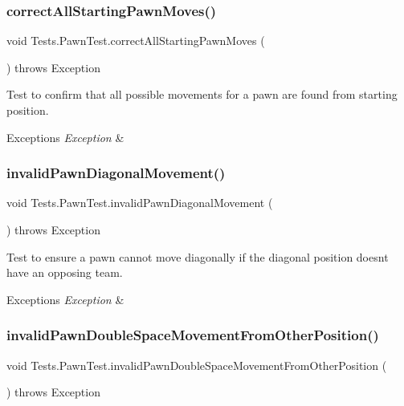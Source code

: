 \subsubsection{\texorpdfstring{correct\+All\+Starting\+Pawn\+Moves()}{correctAllStartingPawnMoves()}}
{\footnotesize\ttfamily void Tests.\+Pawn\+Test.\+correct\+All\+Starting\+Pawn\+Moves (\begin{DoxyParamCaption}{ }\end{DoxyParamCaption}) throws Exception}

Test to confirm that all possible movements for a pawn are found from starting position. 
\begin{DoxyExceptions}{Exceptions}
{\em Exception} & \\
\hline
\end{DoxyExceptions}
\hypertarget{class_tests_1_1_pawn_test_a5de98c4a33ad5690dda92cebdf5612a4}{}\label{class_tests_1_1_pawn_test_a5de98c4a33ad5690dda92cebdf5612a4} 
\subsubsection{\texorpdfstring{invalid\+Pawn\+Diagonal\+Movement()}{invalidPawnDiagonalMovement()}}
{\footnotesize\ttfamily void Tests.\+Pawn\+Test.\+invalid\+Pawn\+Diagonal\+Movement (\begin{DoxyParamCaption}{ }\end{DoxyParamCaption}) throws Exception}

Test to ensure a pawn cannot move diagonally if the diagonal position doesn\textquotesingle{}t have an opposing team. 
\begin{DoxyExceptions}{Exceptions}
{\em Exception} & \\
\hline
\end{DoxyExceptions}
\hypertarget{class_tests_1_1_pawn_test_a62b592bc182e06d091c635fd46cf835b}{}\label{class_tests_1_1_pawn_test_a62b592bc182e06d091c635fd46cf835b} 
\subsubsection{\texorpdfstring{invalid\+Pawn\+Double\+Space\+Movement\+From\+Other\+Position()}{invalidPawnDoubleSpaceMovementFromOtherPosition()}}
{\footnotesize\ttfamily void Tests.\+Pawn\+Test.\+invalid\+Pawn\+Double\+Space\+Movement\+From\+Other\+Position (\begin{DoxyParamCaption}{ }\end{DoxyParamCaption}) throws Exception}

